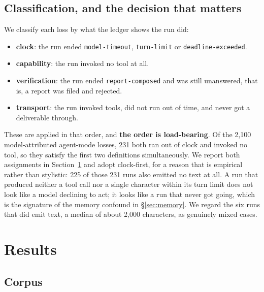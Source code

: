 \documentclass[11pt]{article}
\newcommand{\code}[1]{\texttt{\small #1}}
\begin{document}
\subsection{Classification, and the decision that matters}
\label{sec:classdef}

We classify each loss by what the ledger shows the run did:

\begin{itemize}
\item \textbf{clock}: the run ended \code{model-timeout}, \code{turn-limit} or \code{deadline-exceeded}.
\item \textbf{capability}: the run invoked no tool at all.
\item \textbf{verification}: the run ended \code{report-composed} and was still unanswered, that is, a report was
filed and rejected.
\item \textbf{transport}: the run invoked tools, did not run out of time, and never got a deliverable through.
\end{itemize}

These are applied in that order, and \textbf{the order is load-bearing}. Of the 2{,}100 model-attributed agent-mode losses,
231 both ran out of clock and invoked no tool, so they satisfy the first two definitions simultaneously. We
report both assignments in Section~\ref{sec:results} and adopt clock-first, for a reason that is empirical rather
than stylistic: 225 of those 231 runs also emitted no text at all. A run that produced neither a tool call nor a
single character within its turn limit does not look like a model declining to act; it looks like a run that
never got going, which is the signature of the memory confound in \S\ref{sec:memory}. We regard the six runs that
did emit text, a median of about 2{,}000 characters, as genuinely mixed cases.

\section{Results}
\label{sec:results}

\subsection{Corpus}
\end{document}
